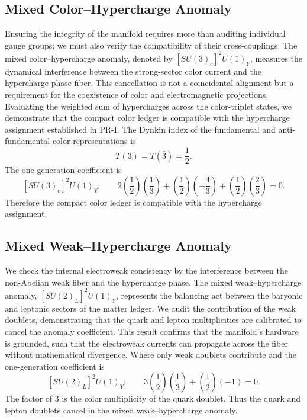 \documentclass[11pt]{article}
\begin{document}
\subsection{Mixed Color--Hypercharge Anomaly}
\label{sec:pr2_mixed_color_hypercharge_anomaly}
Ensuring the integrity of the manifold requires more than auditing individual gauge groups; we must also verify the compatibility of their cross-couplings. The mixed color–hypercharge anomaly, denoted by $[SU(3)_c]^2U(1)_Y$, measures the dynamical interference between the strong-sector color current and the hypercharge phase fiber. This cancellation is not a coincidental alignment but a requirement for the coexistence of color and electromagnetic projections. Evaluating the weighted sum of hypercharges across the color-triplet states, we demonstrate that the compact color ledger is compatible with the hypercharge assignment established in PR-I. The Dynkin index of the fundamental and anti-fundamental color representations is
\begin{equation}
T(3)=T(\bar 3)=\frac12.
\end{equation}
The one-generation coefficient is
\begin{equation}
\boxed{
[SU(3)_c]^2U(1)_Y:
\qquad
2\left(\frac12\right)\left(\frac13\right)
+
\left(\frac12\right)\left(-\frac43\right)
+
\left(\frac12\right)\left(\frac23\right)
=
0.}
\end{equation}
Therefore the compact color ledger is compatible with the hypercharge assignment.

\subsection{Mixed Weak--Hypercharge Anomaly}
\label{sec:pr2_mixed_weak_hypercharge_anomaly}

We check the internal electroweak consistency by the interference between the non-Abelian weak fiber and the hypercharge phase. The mixed weak–hypercharge anomaly, $[SU(2)_L]^2U(1)_Y$, represents the balancing act between the baryonic and leptonic sectors of the matter ledger. We audit the contribution of the weak doublets, demonstrating that the quark and lepton multiplicities are calibrated to cancel the anomaly coefficient. This result confirms that the manifold’s hardware is grounded, such that the electroweak currents can propagate across the fiber without mathematical divergence. Where only weak doublets contribute and the one-generation coefficient is
\begin{equation}
\boxed{
[SU(2)_L]^2U(1)_Y:
\qquad
3\left(\frac12\right)\left(\frac13\right)
+
\left(\frac12\right)(-1)
=
0.
}
\end{equation}
The factor of \(3\) is the color multiplicity of the quark doublet. 
Thus the quark and lepton doublets cancel in the mixed weak--hypercharge anomaly.
\end{document}
